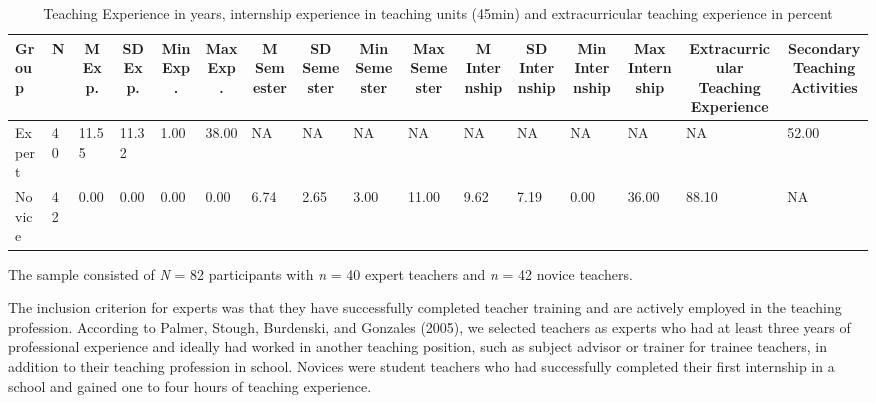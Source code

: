 \documentclass[
  man]{apa6}
\begin{document}
\begin{table}[h]

\begin{center}
\begin{threeparttable}

\caption{\label{tab:demographicstable}Teaching Experience in years, internship experience in teaching units (45min) and extracurricular teaching experience in percent}

\tiny{

\begin{tabular}{llllllllllllllll}
\toprule
Group & \multicolumn{1}{c}{N} & \multicolumn{1}{c}{M Exp.} & \multicolumn{1}{c}{SD Exp.} & \multicolumn{1}{c}{Min Exp.} & \multicolumn{1}{c}{Max Exp.} & \multicolumn{1}{c}{M Semester} & \multicolumn{1}{c}{SD Semester} & \multicolumn{1}{c}{Min Semester} & \multicolumn{1}{c}{Max Semester} & \multicolumn{1}{c}{M Internship} & \multicolumn{1}{c}{SD Internship} & \multicolumn{1}{c}{Min Internship} & \multicolumn{1}{c}{Max Internship} & \multicolumn{1}{c}{Extracurricular Teaching Experience} & \multicolumn{1}{c}{Secondary Teaching Activities}\\
\midrule
Expert & 40 & 11.55 & 11.32 & 1.00 & 38.00 & NA & NA & NA & NA & NA & NA & NA & NA & NA & 52.00\\
Novice & 42 & 0.00 & 0.00 & 0.00 & 0.00 & 6.74 & 2.65 & 3.00 & 11.00 & 9.62 & 7.19 & 0.00 & 36.00 & 88.10 & NA\\
\bottomrule
\end{tabular}

}

\end{threeparttable}
\end{center}

\end{table}

The sample consisted of \emph{N} = 82 participants with \emph{n} = 40 expert teachers and \emph{n} = 42 novice teachers.

The inclusion criterion for experts was that they have successfully completed teacher training and are actively employed in the teaching profession. According to Palmer, Stough, Burdenski, and Gonzales (2005), we selected teachers as experts who had at least three years of professional experience and ideally had worked in another teaching position, such as subject advisor or trainer for trainee teachers, in addition to their teaching profession in school. Novices were student teachers who had successfully completed their first internship in a school and gained one to four hours of teaching experience.
\end{document}

